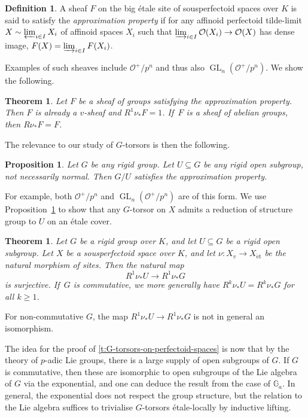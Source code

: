 \documentclass[11pt]{amsart}
\numberwithin{equation}{section}
\newtheorem{Theorem}[thm]{Theorem}
\newtheorem{Proposition}[thm]{Proposition}
\theoremstyle{definition}
\newtheorem{Definition}[thm]{Definition}
\theoremstyle{remark}
\newcommand{\lra}{\longrightarrow}
\newcommand{\G}{\mathbb{G}}
\renewcommand{\O}{\mathcal{O}}
\newcommand{\GL}{\operatorname{GL}}
\newcommand{\et}{{\operatorname{\acute{e}t}}}
\begin{document}
\begin{Definition}
	A sheaf $F$ on the big \'etale site of sousperfectoid spaces over $K$ is said to satisfy the \emph{approximation property} if for any affinoid perfectoid tilde-limit $X\sim \varprojlim_{i\in I} X_i$ of affinoid spaces $X_i$ such that $\varinjlim_{i\in I} \O(X_i)\to \O(X)$ has dense image, $F(X)=\varinjlim_{i\in I} F(X_i)$.
\end{Definition}

Examples of such sheaves include $\O^+/p^n$ and thus also $\GL_n(\O^+/p^n)$.  We show the following. 

\begin{Theorem}
		Let $F$ be a sheaf of groups satisfying the approximation property. Then $F$ is already a $v$-sheaf and 
			$R^1\nu_{\ast} F=1$. If\, $F$ is a sheaf of abelian groups, then $R\nu_{\ast} F=F$.	
\end{Theorem}

The relevance to our study of $G$-torsors is then the following.

\begin{Proposition}\label{prop16}
	Let $G$ be any rigid group. Let $U\subseteq G$ be any rigid open subgroup, not necessarily normal. Then $G/U$ satisfies the approximation property.
\end{Proposition}

For example, both $\O^+/p^n$ and $\GL_n(\O^+/p^n)$ are of this form.
We use Proposition~\ref{prop16} to show that any $G$-torsor on $X$ admits a reduction of structure group to $U$ on an \'etale cover. 

\begin{Theorem}\label{p:reduction-of-structure-group-intro}
	Let $G$ be a rigid group over $K$, and let $U\subseteq G$ be a rigid open subgroup. Let $X$ be a sousperfectoid space over $K$, and let $\nu\colon X_v\to X_{\et}$ be the natural morphism of sites. Then the natural map
	\[ R^1\nu_{\ast}U\lra R^1\nu_{\ast}G\]
	is surjective. If\, $G$ is commutative, we more generally have 
	$R^k\nu_{\ast}U= R^k\nu_{\ast}G$
	for all $k\geq 1$.
\end{Theorem}

For non-commutative $G$, the map $R^1\nu_{\ast}U\to R^1\nu_{\ast}G$ is not in general an isomorphism.

The idea for the proof of  \cref{t:G-torsors-on-perfectoid-spaces} is now that by the theory of $p$-adic Lie groups, there is a large supply of open subgroups of $G$. If $G$ is commutative, then these are isomorphic to open subgroups of the Lie algebra of $G$ via the exponential, and one can deduce the result from the case of $\G_a$. In general, the exponential does not respect the group structure, but the relation to the Lie algebra suffices to trivialise $G$-torsors \'etale-locally by inductive lifting.
\end{document}
